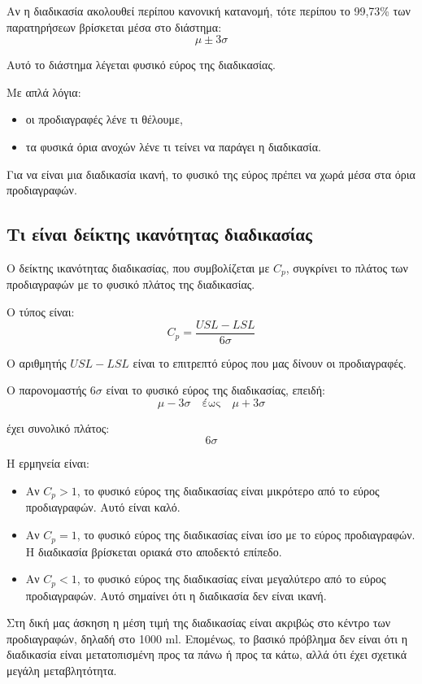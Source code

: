 \documentclass[12pt,a4paper]{article}
\begin{document}
Αν η διαδικασία ακολουθεί περίπου κανονική κατανομή, τότε περίπου το 99,73\% των παρατηρήσεων βρίσκεται μέσα στο διάστημα:
\[
\mu \pm 3\sigma
\]

Αυτό το διάστημα λέγεται φυσικό εύρος της διαδικασίας.

Με απλά λόγια:

\begin{itemize}
    \item οι προδιαγραφές λένε τι θέλουμε,
    \item τα φυσικά όρια ανοχών λένε τι τείνει να παράγει η διαδικασία.
\end{itemize}

Για να είναι μια διαδικασία ικανή, το φυσικό της εύρος πρέπει να χωρά μέσα στα όρια προδιαγραφών.

\subsection{Τι είναι δείκτης ικανότητας διαδικασίας}

Ο δείκτης ικανότητας διαδικασίας, που συμβολίζεται με \(C_p\), συγκρίνει το πλάτος των προδιαγραφών με το φυσικό πλάτος της διαδικασίας.

Ο τύπος είναι:
\[
C_p=\frac{USL-LSL}{6\sigma}
\]

Ο αριθμητής \(USL-LSL\) είναι το επιτρεπτό εύρος που μας δίνουν οι προδιαγραφές.

Ο παρονομαστής \(6\sigma\) είναι το φυσικό εύρος της διαδικασίας, επειδή:
\[
\mu-3\sigma \quad \text{έως} \quad \mu+3\sigma
\]

έχει συνολικό πλάτος:
\[
6\sigma
\]

Η ερμηνεία είναι:

\begin{itemize}
    \item Αν \(C_p>1\), το φυσικό εύρος της διαδικασίας είναι μικρότερο από το εύρος προδιαγραφών. Αυτό είναι καλό.
    \item Αν \(C_p=1\), το φυσικό εύρος της διαδικασίας είναι ίσο με το εύρος προδιαγραφών. Η διαδικασία βρίσκεται οριακά στο αποδεκτό επίπεδο.
    \item Αν \(C_p<1\), το φυσικό εύρος της διαδικασίας είναι μεγαλύτερο από το εύρος προδιαγραφών. Αυτό σημαίνει ότι η διαδικασία δεν είναι ικανή.
\end{itemize}

Στη δική μας άσκηση η μέση τιμή της διαδικασίας είναι ακριβώς στο κέντρο των προδιαγραφών, δηλαδή στο 1000 ml. Επομένως, το βασικό πρόβλημα δεν είναι ότι η διαδικασία είναι μετατοπισμένη προς τα πάνω ή προς τα κάτω, αλλά ότι έχει σχετικά μεγάλη μεταβλητότητα.
\end{document}
